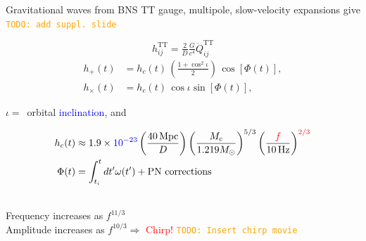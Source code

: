 \documentclass[xcolor=dvipsnames,handout,t]{beamer}
\newcommand{\todo}[1]{\textcolor{orange}{\texttt{TODO: #1}}}
\newcommand{\red}[1]{\textcolor{red}{#1}}
\newcommand{\bl}[1]{\textcolor{blue}{#1}}
\newcommand{\f}{\frac}
\newcommand{\nn}{\nonumber}
\begin{document}
\begin{frame}{Gravitational waves from BNS}
TT gauge, multipole, slow-velocity expansions give \todo{add suppl. slide}
\begin{small}
\[
 h_{ij}^\text{TT} = \tfrac{2}{D}\tfrac{G}{c^4} \ddot{Q}_{ij}^\text{TT}%
\]
%
 \begin{align*}
 h_+(t) &= h_c(t)\, \left(\f{1+\cos^2\iota}{2}\right)\, \cos[\Phi(t)],\\
 h_\times(t) & =h_c(t)\,\cos\iota \sin[\Phi(t)],
\end{align*}
\end{small}
%
%
$\iota =\,$ orbital \bl{inclination}, and
\vspace{-3mm}
%
\begin{small}
\begin{align*}
h_c(t) %
&\approx 1.9\times \bl{10^{-23}} \left(\f{40\,\text{Mpc}}{D}\right)\left(\f{M_c}{1.219 M_\odot}\right)^{5/3}\left(\frac{\red{f}}{10\,\text{Hz}}\right)^{\red{2/3}} \nn\\
\Phi(t) &=\int_{t_i}^t dt' \omega(t') + \text{PN corrections}
\end{align*}
\end{small}\\
%
Frequency increases as $f^{11/3}$\\
Amplitude increases as $f^{10/3} \Longrightarrow$ \red{Chirp!} \todo{Insert chirp movie}

\end{frame}
\end{document}
